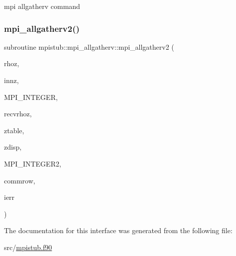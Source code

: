 mpi allgatherv command 

\mbox{\label{interfacempistub_1_1mpi__allgatherv_a1b8326d4776e2f450a05bd8de2f21512}} 
\subsubsection{\texorpdfstring{mpi\_allgatherv2()}{mpi\_allgatherv2()}}
{\footnotesize\ttfamily subroutine mpistub\+::mpi\+\_\+allgatherv\+::mpi\+\_\+allgatherv2 (\begin{DoxyParamCaption}\item[{integer, dimension(\+:)}]{rhoz,  }\item[{}]{innz,  }\item[{}]{M\+P\+I\+\_\+\+I\+N\+T\+E\+G\+ER,  }\item[{integer, dimension(\+:)}]{recvrhoz,  }\item[{integer, dimension(\+:)}]{ztable,  }\item[{integer, dimension(\+:)}]{zdisp,  }\item[{}]{M\+P\+I\+\_\+\+I\+N\+T\+E\+G\+E\+R2,  }\item[{integer}]{commrow,  }\item[{}]{ierr }\end{DoxyParamCaption})}



The documentation for this interface was generated from the following file\+:\begin{DoxyCompactItemize}
\item 
src/\mbox{\hyperlink{mpistub_8f90}{mpistub.\+f90}}\end{DoxyCompactItemize}
